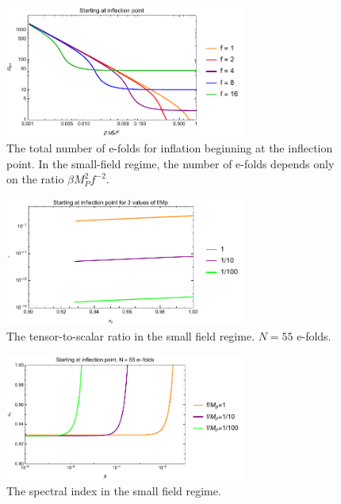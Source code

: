 \documentclass[aps,amsfonts,amsmath,prd,preprint,nofootinbib,superscriptaddress]{revtex4}
\newcommand{\MMp}{{M_P^2}}
\begin{document}
\begin{figure}[!h]
  \centering
    \includegraphics[width=0.7\textwidth]{figures/NvsBetaf-2.pdf}
    \caption{The total number of e-folds for inflation beginning at the inflection point.  In the small-field regime, the number of e-folds depends only on the ratio $\beta \MMp f^{-2}.$}
\end{figure}



\begin{figure}[!h]
  \centering
    \includegraphics[width=0.7\textwidth]{figures/rvsnsplot.pdf}
    \caption{The tensor-to-scalar ratio in the small field regime.  $N = 55$ e-folds.}
\end{figure}




\begin{figure}[!h]
  \centering
    \includegraphics[width=0.7\textwidth]{figures/nsvsbetaplot2.pdf}
    \caption{The spectral index in the small field regime.}
\end{figure}
\end{document}
